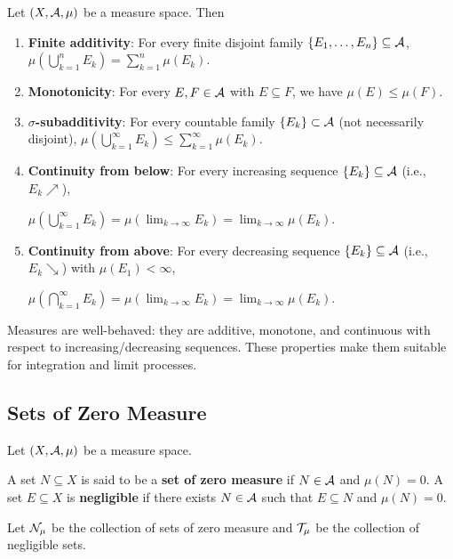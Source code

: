 \begin{theorem}
Let $(X, \mathcal{A}, \mu)$ be a measure space. Then
\begin{enumerate}
    \item \textbf{Finite additivity}: For every finite disjoint family $\{E_1, \dots, E_n\} \subseteq \mathcal{A}$,
    $\mu\left(\bigcup_{k=1}^{n} E_k\right) = \sum_{k=1}^{n} \mu(E_k)$.

    \item \textbf{Monotonicity}: For every $E, F \in \mathcal{A}$ with $E \subseteq F$, we have $\mu(E) \leq \mu(F)$.

    \item \textbf{$\sigma$-subadditivity}: For every countable family $\{E_k\} \subset \mathcal{A}$ (not necessarily disjoint),
    $\mu\left(\bigcup_{k=1}^{\infty} E_k\right) \leq \sum_{k=1}^{\infty} \mu(E_k)$.

    \item \textbf{Continuity from below}: For every increasing sequence $\{E_k\} \subseteq \mathcal{A}$ (i.e., $E_k \nearrow$),
    
     $\mu\left(\bigcup_{k=1}^{\infty} E_k\right) = \mu\left(\lim_{k \to \infty} E_k\right) = \lim_{k \to \infty} \mu(E_k)$.

    \item \textbf{Continuity from above}: For every decreasing sequence $\{E_k\} \subseteq \mathcal{A}$ (i.e., $E_k \searrow$) with $\mu(E_1) < \infty$,
    
     $\mu\left(\bigcap_{k=1}^{\infty} E_k\right) = \mu\left(\lim_{k \to \infty} E_k\right) = \lim_{k \to \infty} \mu(E_k)$.
\end{enumerate}
\end{theorem}

\begin{remark}
Measures are well-behaved: they are additive, monotone, and continuous with respect to increasing/decreasing sequences. These properties make them suitable for integration and limit processes.
\end{remark}

\subsection{Sets of Zero Measure}
Let $(X, \mathcal{A}, \mu)$ be a measure space.

\begin{definition}
A set $N \subseteq X$ is said to be a \textbf{set of zero measure} if $N \in \mathcal{A}$ and $\mu(N) = 0$.
A set $E \subseteq X$ is \textbf{negligible} if there exists $N \in \mathcal{A}$ such that $E \subseteq N$ and $\mu(N) = 0$.

Let $\mathcal{N}_\mu$ be the collection of sets of zero measure and $\mathcal{T}_\mu$ be the collection of negligible sets.
\end{definition}

